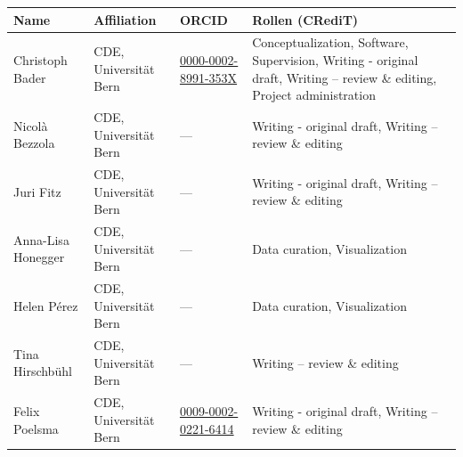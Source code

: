 \documentclass[
  nswissgerman,
  a4paper,
  DIV=11,
  numbers=noendperiod,
  oneside,
  openany]{scrreprt}
\newcounter{none} %
\begin{document}
\begin{tcolorbox}[enhanced jigsaw, arc=.35mm, bottomrule=.15mm, bottomtitle=1mm, breakable, colback=white, colbacktitle=quarto-callout-note-color!10!white, colframe=quarto-callout-note-color-frame, coltitle=black, left=2mm, leftrule=.75mm, opacityback=0, opacitybacktitle=0.6, rightrule=.15mm, title={Beitragsmatrix (CRediT-Taxonomie)}, titlerule=0mm, toprule=.15mm, toptitle=1mm]

{\def\LTcaptype{none} %
\begin{longtable}[]{@{}
  >{\raggedright\arraybackslash}p{}
  >{\raggedright\arraybackslash}p{}
  >{\raggedright\arraybackslash}p{}
  >{\raggedright\arraybackslash}p{}@{}}
\toprule\noalign{}
\begin{minipage}[b]{\linewidth}\raggedright
Name
\end{minipage} & \begin{minipage}[b]{\linewidth}\raggedright
Affiliation
\end{minipage} & \begin{minipage}[b]{\linewidth}\raggedright
ORCID
\end{minipage} & \begin{minipage}[b]{\linewidth}\raggedright
Rollen (CRediT)
\end{minipage} \\
\midrule\noalign{}
\endhead
\bottomrule\noalign{}
\endlastfoot
Christoph Bader & CDE, Universität Bern &
\href{https://orcid.org/0000-0002-8991-353X}{0000-0002-8991-353X} &
Conceptualization, Software, Supervision, Writing - original draft,
Writing -- review \& editing, Project administration \\
Nicolà Bezzola & CDE, Universität Bern & --- & Writing - original draft,
Writing -- review \& editing \\
Juri Fitz & CDE, Universität Bern & --- & Writing - original draft,
Writing -- review \& editing \\
Anna-Lisa Honegger & CDE, Universität Bern & --- & Data curation,
Visualization \\
Helen Pérez & CDE, Universität Bern & --- & Data curation,
Visualization \\
Tina Hirschbühl & CDE, Universität Bern & --- & Writing -- review \&
editing \\
Felix Poelsma & CDE, Universität Bern &
\href{https://orcid.org/0009-0002-0221-6414}{0009-0002-0221-6414} &
Writing - original draft, Writing -- review \& editing \\
\end{longtable}
}

\end{tcolorbox}
\end{document}
